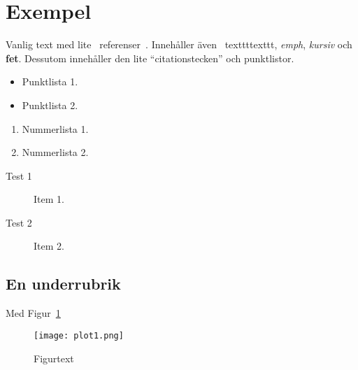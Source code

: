 \documentclass[conference,a4paper]{IEEEtran}
\begin{document}
\section{Exempel}
Vanlig text med lite~\cite{biggs84} referenser~\cite{web:pox}. Innehåller även \
texttt{texttt}, \emph{emph}, \textit{kursiv} och \textbf{fet}. Dessutom innehåller
den lite ``citationstecken'' och punktlistor.
\begin{itemize}
\item Punktlista 1.
\item Punktlista 2.
\end{itemize}
\begin{enumerate}
\item Nummerlista 1.
\item Nummerlista 2.
\end{enumerate}
\begin{description}
\item[Test 1] Item 1.
\item[Test 2] Item 2.
\end{description}
\subsection{En underrubrik}
Med Figur~\ref{fig1}
\begin{figure}
\center
\texttt{[image: plot1.png]}
\caption{Figurtext}
\label{fig1}
\end{figure}
\printbibliography
\end{document}
